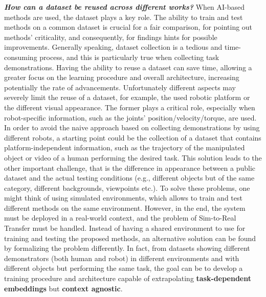 \newline \textbf{\textit{How can a dataset be reused across different works?}} When AI-based methods are used, the dataset plays a key role. The ability to train and test methods on a common dataset is crucial for a fair comparison, for pointing out methods' criticality, and consequently, for findings hints for possible improvements. Generally speaking, dataset collection is a tedious and time-consuming process, and this is particularly true when collecting task demonstrations. Having the ability to reuse a dataset can save time, allowing a greater focus on the learning procedure and overall architecture, increasing potentially the rate of advancements. Unfortunately different aspects may severely limit the reuse of a dataset, for example, the used robotic platform or the different visual appearance. The former plays a critical role, especially when robot-specific information, such as the joints' position/velocity/torque, are used. %
In order to avoid the naive approach based on collecting demonstrations by using different robots, a starting point could be the collection of a dataset that contains platform-independent information, such as the trajectory of the manipulated object or video of a human performing the desired task. This solution leads to the other important challenge, that is the difference in appearance between a public dataset and the actual testing conditions (e.g., different objects but of the same category, different backgrounds, viewpoints etc.). To solve these problems, one might think of using simulated environments, which allows to train and test different methods on the same environment. However, in the end, the system must be deployed in a real-world context, and the problem of Sim-to-Real Transfer must be handled. Instead of having a shared environment to use for training and testing the proposed methods, an alternative solution can be found by formalizing the problem differently. In fact, from datasets showing different demonstrators (both human and robot) in different environments and with different objects but performing the same task, the goal can be to develop a training procedure and architecture capable of extrapolating \textbf{task-dependent embeddings} but \textbf{context agnostic}. %
